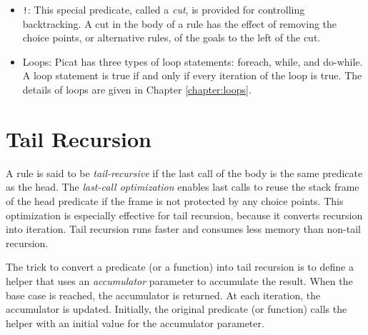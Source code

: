\begin{itemize}
\item \verb+!+: This special predicate, called a \textit{cut}, is provided for controlling backtracking. A cut in the body of a rule has the effect of removing the choice points, or alternative rules, of the goals to the left of the cut. 

\item Loops: Picat has three types of loop statements: foreach, while, and do-while.  A loop statement is true if and only if every iteration of the loop is true. The details of loops are given in Chapter \ref{chapter:loops}.
\end{itemize}

\section{Tail Recursion}
A rule is said to be \emph{tail-recursive} if the last call of the body is the same predicate as the head. The \emph{last-call optimization} enables last calls to reuse the stack frame of the head predicate if the frame is not protected by any choice points. This optimization is especially effective for tail recursion, because it converts recursion into iteration. Tail recursion runs faster and consumes less memory than non-tail recursion.

The trick to convert a predicate (or a function) into tail recursion is to define a helper that uses an \emph{accumulator} parameter to accumulate the result. When the base case is reached, the accumulator is returned. At each iteration, the accumulator is updated. Initially, the original predicate (or function) calls the helper with an initial value for the accumulator parameter.



